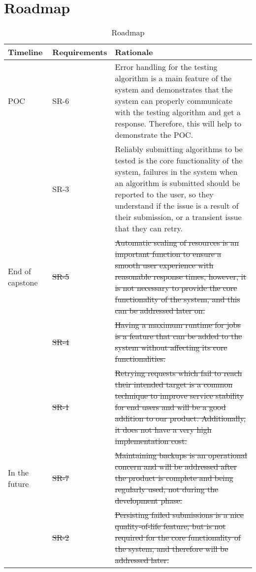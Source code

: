 \documentclass{article}
\begin{document}
\section{Roadmap}

\begin{table}[h]
    \centering
    \caption{Roadmap} \label{TblRoadmap}
    \begin{tabularx}{\textwidth}{|P{3cm}|P{3cm}|P{9.2cm}|}
        \hline
        \textbf{Timeline} & \textbf{Requirements} & \textbf{Rationale}\\
        \hline
        POC & SR-6 & Error handling for the testing algorithm is a main feature of the system and demonstrates that the system can properly communicate with the testing algorithm and get a response. Therefore, this will help to demonstrate the POC.\\
        & SR-3 & Reliably submitting algorithms to be tested is the core functionality of the system, failures in the system when an algorithm is submitted should be reported to the user, so they understand if the issue is a result of their submission, or a transient issue that they can retry. \\
        \hline
        End of capstone & \sout{SR-5} & \sout{Automatic scaling of resources is an important function to ensure a smooth user experience with reasonable response times, however, it is not necessary to provide the core functionality of the system, and this can be addressed later on.}\\
        & \sout{SR-4} & \sout{Having a maximum runtime for jobs is a feature that can be added to the system without affecting its core functionalities.}\\
        & \sout{SR-1} & \sout{Retrying requests which fail to reach their intended target is a common technique to improve service stability for end users and will be a good addition to our product. Additionally, it does not have a very high implementation cost.}\\
        \hline
        In the future & \sout{SR-7} & \sout{Maintaining backups is an operational concern and will be addressed after the product is complete and being regularly used, not during the development phase.}\\
        & \sout{SR-2} & \sout{Persisting failed submissions is a nice quality-of-life feature, but is not required for the core functionality of the system, and therefore will be addressed later.}\\
        \hline
    \end{tabularx}
\end{table}
\newpage{}
\end{document}
